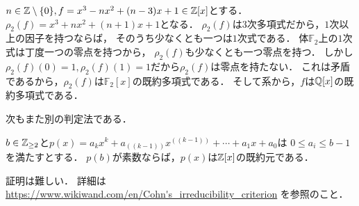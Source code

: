 \documentclass[a4j]{jsarticle}
\begin{document}
\begin{Example}
    $n \in \mathbb{Z} \setminus \{0\}, f=x^3-nx^2+(n-3)x+1 \in \mathbb{Z}[x]$とする．
    $\rho_2(f)=x^3+nx^2+(n+1)x+1$となる．
    $\rho_2(f)$は$3$次多項式だから，$1$次以上の因子を持つならば，
    そのうち少なくとも一つは$1$次式である．
    体$\mathbb{F}_2$上の$1$次式は丁度一つの零点を持つから，
    $\rho_2(f)$も少なくとも一つ零点を持つ．
    しかし$\rho_2(f)(0)=1, \rho_2(f)(1)=1$だから$\rho_2(f)$は零点を持たない．
    これは矛盾であるから，$\rho_2(f)$は$\mathbb{F}_2[x]$の既約多項式である．
    そして系から，$f$は$\mathbb{Q}[x]$の既約多項式である．
\end{Example}

次もまた別の判定法である．
\begin{Thm}
    $b \in \mathbb{Z}_{\geq 2}$と$p(x)=a_{k}x^{k}+a_((k-1))x^((k-1))+\cdots +a_{1}x+a_{0}$は
    $0 \leq a_{i}\leq b-1$を満たすとする．
    $p(b)$が素数ならば，$p(x)$は$\mathbb{Z}[x]$の既約元である．
\end{Thm}
証明は難しい．
詳細は\url{https://www.wikiwand.com/en/Cohn's_irreducibility_criterion} を参照のこと．
\end{document}
